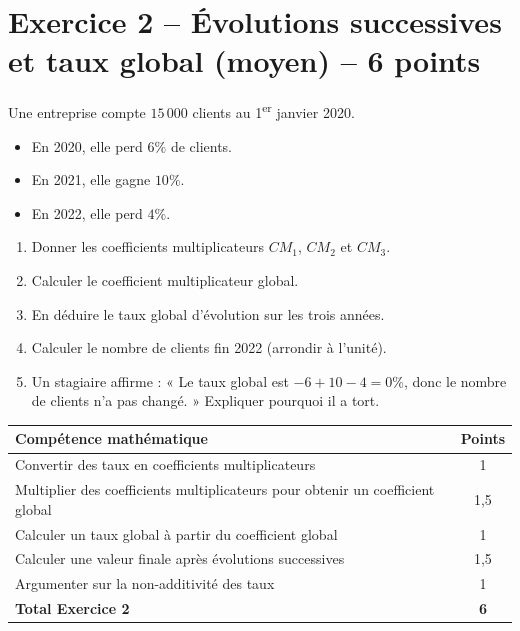 \documentclass[12pt,a4paper]{article}
\begin{document}
\section*{Exercice 2 -- Évolutions successives et taux global (moyen) -- 6 points}

Une entreprise compte \(15\,000\) clients au 1\textsuperscript{er} janvier 2020.

\begin{itemize}
    \item En 2020, elle perd \(6\%\) de clients.
    \item En 2021, elle gagne \(10\%\).
    \item En 2022, elle perd \(4\%\).
\end{itemize}

\begin{enumerate}[label=\textbf{\arabic*.}]
    \item Donner les coefficients multiplicateurs \(CM_1\), \(CM_2\) et \(CM_3\).
    \item Calculer le coefficient multiplicateur global.
    \item En déduire le taux global d'évolution sur les trois années.
    \item Calculer le nombre de clients fin 2022 (arrondir à l'unité).
    \item Un stagiaire affirme : « Le taux global est \(-6+10-4 = 0\%\), donc le nombre de clients n'a pas changé. » Expliquer pourquoi il a tort.
\end{enumerate}

\begin{center}
\renewcommand{\arraystretch}{1.5}
\begin{tabular}{>{\raggedright\arraybackslash}p{10.5cm} c}
\hline
\textbf{Compétence mathématique} & \textbf{Points} \\
\hline
Convertir des taux en coefficients multiplicateurs & 1 \\
\hline
Multiplier des coefficients multiplicateurs pour obtenir un coefficient global & 1{,}5 \\
\hline
Calculer un taux global à partir du coefficient global & 1 \\
\hline
Calculer une valeur finale après évolutions successives & 1{,}5 \\
\hline
Argumenter sur la non-additivité des taux & 1 \\
\hline
\textbf{Total Exercice 2} & \textbf{6} \\
\hline
\end{tabular}
\end{center}
\end{document}
